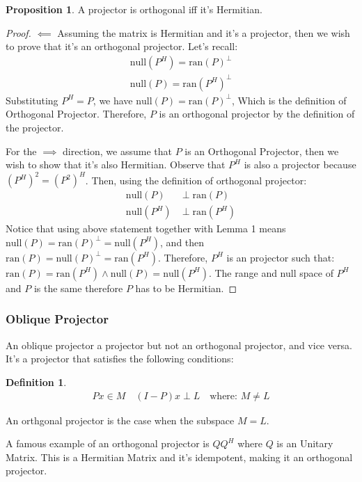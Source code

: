 \documentclass[]{article}
\theoremstyle{definition}
\newtheorem{prop}{Proposition}
\newtheorem{definition}{Definition}
\begin{document}
            \begin{prop}
                A projector is orthogonal iff it's Hermitian. 
            \end{prop}
            \begin{proof}
                $\impliedby$ Assuming the matrix is Hermitian and it's a projector, then we wish to prove that it's an orthogonal projector. Let's recall: 
                \begin{align}
                    \text{null}(P^H) = \text{ran}(P)^{\perp}
                    \\
                    \text{null}(P) = \text{ran}(P^H)^{\perp}
                \end{align}
                Substituting $P^H = P$, we have $\text{null}(P) = \text{ran}(P)^{\perp}$, Which is the definition of Orthogonal Projector. Therefore, $P$ is an orthogonal projector by the definition of the projector. 
                \par
                For the $\implies$ direction, we assume that $P$ is an Orthogonal Projector, then we wish to show that it's also Hermitian. Observe that $P^H$ is also a projector because $(P^H)^2 = (P^2)^H$. Then, using the definition of orthogonal projector: 
                \begin{align}
                    \text{null}(P) &\perp\text{ran}(P) 
                    \\
                    \text{null}(P^H) &\perp \text{ran}(P^H)
                \end{align}
                Notice that using above statement together with Lemma 1 means $\text{null}(P) = \text{ran}(P)^\perp = \text{null}(P^H)$, and then $\text{ran}(P)=\text{null}(P)^\perp = \text{ran}(P^H)$. Therefore, $P^H$ is an projector such that: $\text{ran}(P) = \text{ran}(P^H) \wedge \text{null}(P) = \text{null}(P^H)$. The range and null space of $P^H$ and $P$ is the same therefore $P$ has to be Hermitian. 
            \end{proof}
            \subsubsection{Oblique Projector}
                An oblique projector a projector but not an orthogonal projector, and vice versa. It's a projector that satisfies the following conditions: 
                \begin{definition}
                    \begin{align}
                        Px \in M \quad (I - P)x \perp L \quad \text{where: } M \neq L
                    \end{align}    
                \end{definition}
                An orthgonal projector is the case when the subspace $M = L$. 
                \par
                A famous example of an orthogonal projector is $QQ^H$ where $Q$ is an Unitary Matrix. This is a Hermitian Matrix and it's idempotent, making it an orthogonal projector. 
\end{document}
